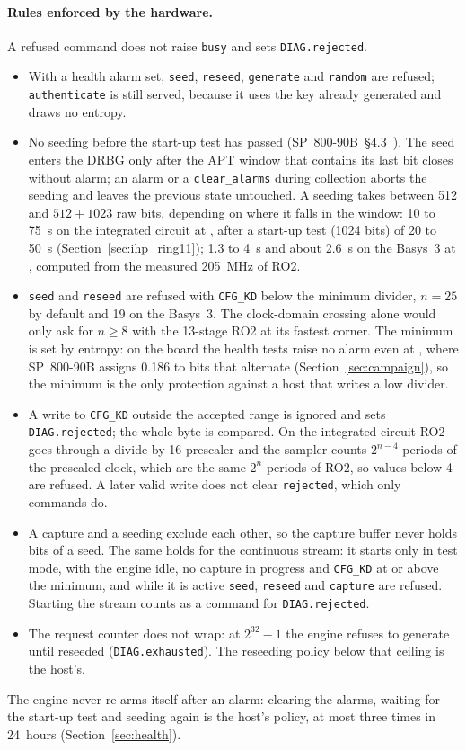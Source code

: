 \paragraph{Rules enforced by the hardware.} A refused command does not
raise \texttt{busy} and sets \texttt{DIAG.rejected}.
\begin{itemize}
\item With a health alarm set, \texttt{seed}, \texttt{reseed},
  \texttt{generate} and \texttt{random} are refused; \texttt{authenticate}
  is still served, because it uses the key already generated and draws
  no entropy.
\item No seeding before the start-up test has passed
  (SP~800-90B~\S4.3~\cite{turan_2018_sp80090b}). The seed enters the
  \ac{DRBG} only after the \ac{APT} window that contains its last bit
  closes without alarm; an alarm or a \texttt{clear\_alarms} during
  collection aborts the seeding and leaves the previous state untouched.
  A seeding takes between 512 and $512 + 1023$ raw bits, depending on
  where it falls in the window: 10 to 75~s on the integrated circuit at
   \est{}, after a start-up test (1024 bits) of 20 to 50~s
  (Section~\ref{sec:ihp_ring11}); 1.3 to 4~s and about 2.6~s on the
  Basys~3 at  \est{}, computed from the measured 205~MHz of RO2.
\item \texttt{seed} and \texttt{reseed} are refused with
  \texttt{CFG\_KD} below the minimum divider, $n = 25$ by default and 19
  on the Basys~3. The clock-domain crossing alone would only ask for
  $n \ge 8$ with the 13-stage RO2 at its fastest corner. The minimum is set by entropy: on the
  board the health tests raise no alarm even at , where SP~800-90B
  assigns 0.186 to bits that alternate \meas{}
  (Section~\ref{sec:campaign}), so the minimum is the only protection
  against a host that writes a low divider.
\item A write to \texttt{CFG\_KD} outside the accepted range is ignored
  and sets \texttt{DIAG.rejected}; the whole byte is compared. On the
  integrated circuit RO2 goes through a divide-by-16 prescaler and the
  sampler counts $2^{n-4}$ periods of the prescaled clock, which are the
  same $2^{n}$ periods of RO2, so values below 4 are refused. A later
  valid write does not clear \texttt{rejected}, which only commands do.
\item A capture and a seeding exclude each other, so the capture buffer
  never holds bits of a seed. The same holds for the continuous stream:
  it starts only in test mode, with the engine idle, no capture in
  progress and \texttt{CFG\_KD} at or above the minimum, and while it is
  active \texttt{seed}, \texttt{reseed} and \texttt{capture} are refused.
  Starting the stream counts as a command for \texttt{DIAG.rejected}.
\item The request counter does not wrap: at $2^{32}-1$ the engine
  refuses to generate until reseeded (\texttt{DIAG.exhausted}). The
  reseeding policy below that ceiling is the host's.
\end{itemize}
The engine never re-arms itself after an alarm: clearing the alarms,
waiting for the start-up test and seeding again is the host's policy, at
most three times in 24~hours (Section~\ref{sec:health}).

